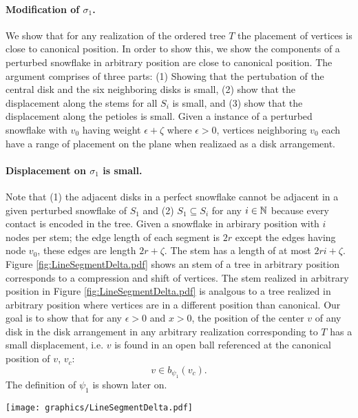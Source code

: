 
\paragraph{Modification of $\sigma_1$.}
We show that for any realization of the ordered tree $T$
 the placement of vertices is close to canonical position.  
In order to show this, we show the components of a perturbed snowflake in arbitrary position  are close to canonical position.  
The argument comprises of three parts: (1) Showing that the pertubation of the central disk and the six neighboring disks is small, (2) show that the displacement along the stems for all $S_i$ is small, and (3) show that the displacement along the petioles is small.  
Given a instance of a perturbed snowflake with $v_0$ having weight $\epsilon + \zeta$ where $\epsilon > 0$, vertices neighboring $v_0$ each have a range of placement on the plane when realizaed as a disk arrangement. 

\paragraph{Displacement on $\sigma_1$ is small.}
Note that (1) the adjacent disks in a perfect snowflake cannot be adjacent in a given perturbed snowflake of $S_1$ and (2) $S_1 \subseteq S_i$ for any $i \in {\mathbb{N}}$ because every contact is encoded in the tree.  
Given a snowflake in arbirary position with $i$ nodes per stem; the edge length of each segment is $2r$ except the edges having node $v_0$, these edges are length $2r+ \zeta$.  
The stem has a length of at most $2ri+\zeta$.
Figure \ref{fig:LineSegmentDelta.pdf} shows an stem of a tree in arbitrary position corresponds to a compression and shift of vertices.  
The stem realized in arbitrary position in Figure \ref{fig:LineSegmentDelta.pdf} is analgous to a tree realized in arbitrary position where vertices are in a different position than canonical.  
Our goal is to show that for any $\epsilon >0$ and $x >0$, the position of the center $v$ of any disk in the disk arrangement in any arbitrary realization corresponding to $T$ has a small displacement, i.e. $v$ is found in an open ball referenced at the canonical position of $v$, $v_c$: $$v \in b_{\psi_1}(v_c).$$ 
The definition of $\psi_1$ is shown later on.

\begin{minipage}{\linewidth}
\begin{center}
\texttt{[image: graphics/LineSegmentDelta.pdf]}
\label{fig:LineSegmentDelta.pdf}
\end{center}
\end{minipage}
 
